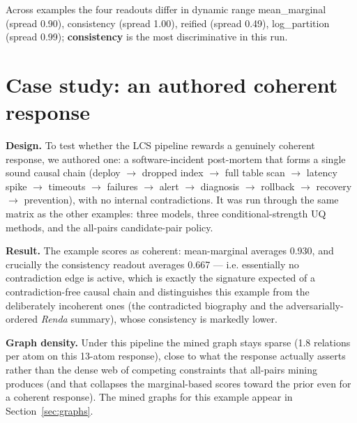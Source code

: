 \documentclass[11pt]{article}
\begin{document}
Across examples the four readouts differ in dynamic range mean\_marginal (spread 0.90), consistency (spread 1.00), reified (spread 0.49), log\_partition (spread 0.99); \textbf{consistency} is the most discriminative in this run.

\section{Case study: an authored coherent response}

\textbf{Design.} To test whether the LCS pipeline rewards a genuinely coherent response, we authored one: a software-incident post-mortem that forms a single sound causal chain (deploy $\to$ dropped index $\to$ full table scan $\to$ latency spike $\to$ timeouts $\to$ failures $\to$ alert $\to$ diagnosis $\to$ rollback $\to$ recovery $\to$ prevention), with no internal contradictions. It was run through the same matrix as the other examples: three models, three conditional-strength UQ methods, and the all-pairs candidate-pair policy.

\textbf{Result.} The example scores as coherent: mean-marginal averages 0.930, and crucially the consistency readout averages 0.667 --- i.e. essentially no contradiction edge is active, which is exactly the signature expected of a contradiction-free causal chain and distinguishes this example from the deliberately incoherent ones (the contradicted biography and the adversarially-ordered \emph{Renda} summary), whose consistency is markedly lower.

\textbf{Graph density.} Under this pipeline the mined graph stays sparse (1.8 relations per atom on this 13-atom response), close to what the response actually asserts rather than the dense web of competing constraints that all-pairs mining produces (and that collapses the marginal-based scores toward the prior even for a coherent response). The mined graphs for this example appear in Section~\ref{sec:graphs}.
\end{document}
